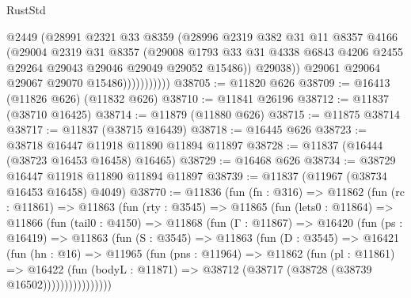 \begin{lexlean}{RustStd}
\begin{coremodule}
{\begin{coremodule}
{{{{{{{{{{{{{{{{{{{{{{{{{{{{{{{{{{{{{{{{{{{{{{{{{{                          @2449
                          (@28991
                            @2321
                            @33
                            @8359
                            (@28996
                              @2319
                              @382
                              @31
                              @11
                              @8357
                              @4166
                              (@29004
                                @2319
                                @31
                                @8357
                                (@29008
                                  @1793
                                  @33
                                  @31
                                  @4338
                                  @6843
                                  @4206
                                  @2455
                                  @29264
                                  @29043
                                  @29046
                                  @29049
                                  @29052
                                  @15486))
                              @29038))
                          @29061
                          @29064
                          @29067
                          @29070
                          @15486)))))))))))
@38705 := @11820 @626
@38709 := @16413 (@11826 @626) (@11832 @626)
@38710 := @11841 @26196
@38712 := @11837 (@38710 @16425)
@38714 := @11879 (@11880 @626)
@38715 := @11875 @38714
@38717 := @11837 (@38715 @16439)
@38718 := @16445 @626
@38723 := @38718 @16447 @11918 @11890 @11894 @11897
@38728 := @11837 (@16444 (@38723 @16453 @16458) @16465)
@38729 := @16468 @626
@38734 := @38729 @16447 @11918 @11890 @11894 @11897
@38739 := @11837 (@11967 (@38734 @16453 @16458) @4049)
@38770 := @11836
    (fun (fn : @316) =>
    @11862
      (fun (rc : @11861) =>
      @11863
        (fun (rty : @3545) =>
        @11865
          (fun (lets0 : @11864) =>
          @11866
            (fun (tail0 : @4150) =>
            @11868
              (fun (Γ : @11867) =>
              @16420
                (fun (ps : @16419) =>
                @11863
                  (fun (S : @3545) =>
                  @11863
                    (fun (D : @3545) =>
                    @16421
                      (fun (hn : @16) =>
                      @11965
                        (fun (pns : @11964) =>
                        @11862
                          (fun (pl : @11861) =>
                          @16422
                            (fun (bodyL : @11871) =>
                            @38712 (@38717 (@38728 (@38739 @16502))))))))))))))))
}}}}}}}}}}}}}}}}}}}}}}}}}}}}}}}}}}}}}}}}}}}}}}}}}}
\end{coremodule}}
\end{coremodule}
\end{lexlean}
